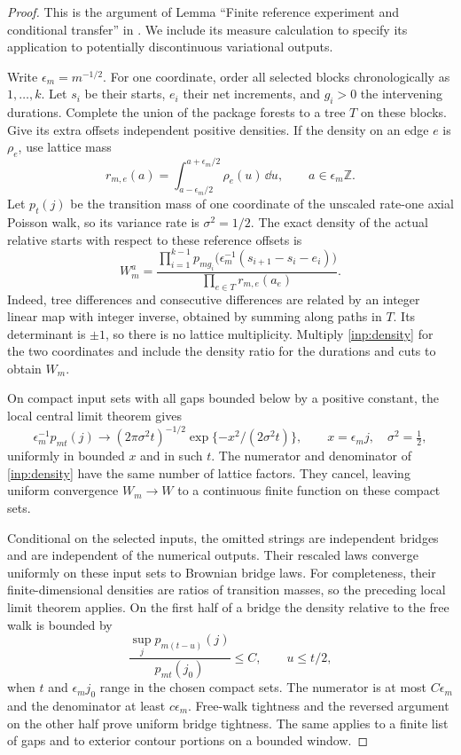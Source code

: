 \begin{proof}
This is the argument of Lemma ``Finite reference experiment and conditional
transfer'' in \cite{MetricMaps}.  We include its measure calculation
to specify its application to potentially discontinuous variational
outputs.

Write $\epsilon_m=m^{-1/2}$.  For one coordinate, order all selected
blocks chronologically as $1,\ldots,k$.  Let $s_i$ be their starts,
$e_i$ their net increments, and $g_i>0$ the intervening durations.
Complete the union of the package forests to a tree $T$ on these
blocks.  Give its extra offsets independent positive densities.
If the density on an edge $e$ is $\rho_e$, use lattice mass
\[
 r_{m,e}(a)=\int_{a-\epsilon_m/2}^{a+\epsilon_m/2}
                      \rho_e(u)\,\dd u,
 \qquad a\in\epsilon_m\mathbb Z.
\]
Let $p_t(j)$ be the transition mass of one coordinate of the
unscaled rate-one axial Poisson walk, so its variance rate is
$\sigma^2=1/2$.  The exact density of the actual relative starts
with respect to these reference offsets is
\begin{equation}\label{inp:density}
 W_m^a=
 \frac{\displaystyle\prod_{i=1}^{k-1}
       p_{mg_i}\bigl(\epsilon_m^{-1}(s_{i+1}-s_i-e_i)\bigr)}
      {\displaystyle\prod_{e\in T}r_{m,e}(a_e)}.
\end{equation}
Indeed, tree differences and consecutive differences are related
by an integer linear map with integer inverse, obtained by summing
along paths in $T$.  Its determinant is $\pm1$, so there is no
lattice multiplicity.  Multiply \eqref{inp:density} for the two
coordinates and include the density ratio for the durations and
cuts to obtain $W_m$.

On compact input sets with all gaps bounded below by a positive
constant, the local central limit theorem gives
\[
 \epsilon_m^{-1}p_{mt}(j)
 \longrightarrow
 (2\pi\sigma^2t)^{-1/2}
       \exp\{-x^2/(2\sigma^2t)\},
 \qquad x=\epsilon_m j,\quad \sigma^2=\tfrac12,
\]
uniformly in bounded $x$ and in such $t$.  The numerator and
denominator of \eqref{inp:density} have the same number of lattice
factors.  They cancel, leaving uniform convergence $W_m\to W$ to
a continuous finite function on these compact sets.

Conditional on the selected inputs, the omitted strings are
independent bridges and are independent of the numerical outputs.
Their rescaled laws converge uniformly on these input sets to
Brownian bridge laws.  For completeness, their finite-dimensional
densities are ratios of transition masses, so the preceding local
limit theorem applies.  On the first half of a bridge the density
relative to the free walk is bounded by
\[
 \frac{\sup_j p_{m(t-u)}(j)}{p_{mt}(j_0)}\le C,
 \qquad u\le t/2,
\]
when $t$ and $\epsilon_mj_0$ range in the chosen compact sets.
The numerator is at most $C\epsilon_m$ and the denominator at
least $c\epsilon_m$.  Free-walk tightness and the reversed argument
on the other half prove uniform bridge tightness.  The same applies
to a finite list of gaps and to exterior contour portions on a
bounded window.


\end{proof}
